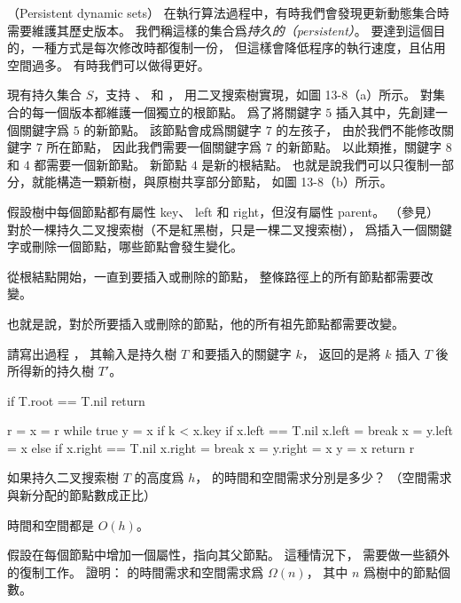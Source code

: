 \startPROBLEM
（Persistent dynamic sets）
在執行算法過程中，有時我們會發現更新動態集合時需要維護其歷史版本。
我們稱這樣的集合爲\emph{持久的（persistent）}。
要達到這個目的，一種方式是每次修改時都復制一份，
但這樣會降低程序的執行速度，且佔用空間過多。
有時我們可以做得更好。

現有持久集合 $S$，支持 、  和 ，
用二叉搜索樹實現，如圖 13-8（a）所示。
對集合的每一個版本都維護一個獨立的根節點。
爲了將關鍵字 $5$ 插入其中，先創建一個關鍵字爲 $5$ 的新節點。
該節點會成爲關鍵字 $7$ 的左孩子，
由於我們不能修改關鍵字 $7$ 所在節點，
因此我們需要一個關鍵字爲 $7$ 的新節點。
以此類推，關鍵字 $8$ 和 $4$ 都需要一個新節點。
新節點 $4$ 是新的根結點。
也就是說我們可以只復制一部分，就能構造一顆新樹，與原樹共享部分節點，
如圖 13-8（b）所示。

假設樹中每個節點都有屬性 key、 left 和 right，但沒有屬性 parent。
（參見\inexercise[13.3-6]）
\startigBase[a]
\startitem%
對於一棵持久二叉搜索樹（不是紅黑樹，只是一棵二叉搜索樹），
爲插入一個關鍵字或刪除一個節點，哪些節點會發生變化。
\stopitem

\startANSWER
從根結點開始，一直到要插入或刪除的節點，
整條路徑上的所有節點都需要改變。

也就是說，對於所要插入或刪除的節點，他的所有祖先節點都需要改變。
\stopANSWER

\startitem%
請寫出過程 ，
其輸入是持久樹 $T$ 和要插入的關鍵字 $k$，
返回的是將 $k$ 插入 $T$ 後所得新的持久樹 $T'$。
\stopitem

\startANSWER
{}
\startCLRSCODE
if T.root == T.nil
	return 

r = 
x = r
while true
	y = x
	if k < x.key
		if x.left == T.nil
			x.left = 
			break
		x = 
		y.left = x
	else
		if x.right == T.nil
			x.right = 
			break
		x = 
		y.right = x
	y = x
return r
\stopCLRSCODE
\stopANSWER

\startitem%
如果持久二叉搜索樹 $T$ 的高度爲 $h$，
  的時間和空間需求分別是多少？
（空間需求與新分配的節點數成正比）
\stopitem

\startANSWER
時間和空間都是 $O(h)$。
\stopANSWER

\startitem%
假設在每個節點中增加一個屬性，指向其父節點。
這種情況下，  需要做一些額外的復制工作。
證明：  的時間需求和空間需求爲 $\Omega(n)$，
其中 $n$ 爲樹中的節點個數。
\stopitem

